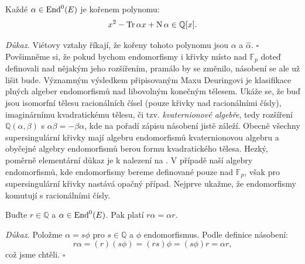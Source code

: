 \documentclass[12pt]{report}
\begin{document}
\begin{veta}\label{kv}
Každé $\alpha \in \operatorname{End}^0 (E)$ je kořenem polynomu:
\begin{equation*}
x^2 - \operatorname{Tr} \alpha x + \operatorname{N} \alpha \in \mathbb{Q}[x].
\end{equation*}
\end{veta}
\noindent \textit{Důkaz.} Viétovy vztahy říkají, že kořeny tohoto polynomu jsou $\alpha$ a $\widehat{\alpha}$. \hfill $\square$\\

Povšimněme si, že pokud bychom endomorfismy i křivky místo nad $\mathbb{F}_p$ doteď definovali nad nějakým jeho rozšířením, pramálo by se změnilo, násobení se ale už lišit bude. Významným výsledkem připisovaným Maxu Deuringovi \cite{Deuring} je klasifikace plných algeber endomorfismů nad libovolným konečným tělesem. Ukáže se, že buď jsou isomorfní tělesu racionálních čísel (pouze křivky nad racionálními čísly), imaginárnímu kvadratickému tělesu, či tzv. \textit{kvaternionové algebře}, tedy rozšíření $\mathbb{Q}(\alpha,\beta)$ s $\alpha \beta = - \beta \alpha$, kde na pořadí zápisu násobení jistě záleží. Obecně všechny supersingulární křivky mají algebru endomorfismů kvaternionovou algebru a obyčejné algebry endomorfismů berou formu kvadratického tělesa. Hezký, poměrně elementární důkaz je k nalezení na \cite[Thm. 13.17]{Sutherland}. V případě naší  algebry endomorfismů, kde endomorfismy bereme definované pouze nad $\mathbb{F}_p$, však pro supersingulární křivky nastává opačný případ. Nejprve ukažme, že endomorfismy komutují s racionálními čísly.

\begin{lemma}
Buďte $r \in \mathbb{Q}$ a $\alpha \in \operatorname{End}^0 (E)$. Pak platí $r \alpha = \alpha r$.
\end{lemma}
\noindent \textit{Důkaz.} Položme $\alpha = s \phi$ pro $s \in \mathbb{Q}$ a $\phi$ endomorfismus. Podle definice násobení:
\begin{equation*}
r \alpha = (r) (s \phi) = (rs) \phi = (s \phi) r = \alpha r,
\end{equation*}
což jsme chtěli. \hfill $\square$\\
\end{document}
